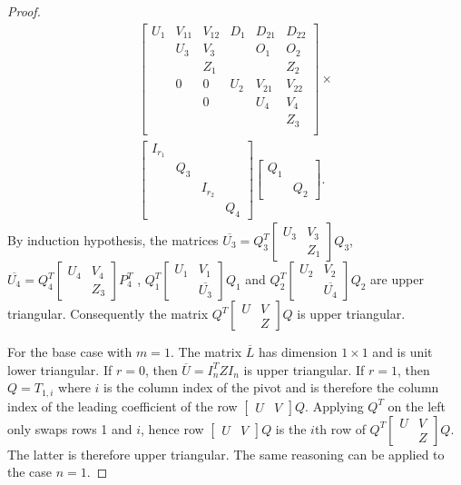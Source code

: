 \documentclass{article}
\begin{document}
\begin{proof}
\begin{equation*}
\begin{split}
    \left[
        \begin{array}{ccc|cccc}
          U_1  & V_{11} & V_{12} &D_1 &D_{21}&D_{22}\\
                &U_3   & V_3    &    &O_1 & O_2\\
                &      & Z_1    &    &   & Z_2\\
                &0     & 0     &U_2 &V_{21}&V_{22}\\
                &      & 0     &    & U_4& V_4\\
                &      &        &    &   &Z_3\\
        \end{array}
      \right]\times \\
      \begin{bmatrix} I_{r_1}\\&Q_3\\&& I_{r_2}\\&&&Q_4 \end{bmatrix}
   \begin{bmatrix}Q_1\\&Q_2 \end{bmatrix}.
\end{split}
\end{equation*}
By induction hypothesis, the matrices
$\overline{U_3}=Q_3^T \begin{bmatrix}U_3&V_3\\&Z_1\end{bmatrix}Q_3$,
$\overline{U_4}=Q_4^T \begin{bmatrix}U_4&V_4\\&Z_3\end{bmatrix}P_4^T$
, $Q_1^T \begin{bmatrix}  U_1&V_1\\     &\overline{U_3} \end{bmatrix} Q_1$
and
$Q_2^T\begin{bmatrix}  U_2&V_2\\  &\overline{U_4}\end{bmatrix}Q_2$ are upper triangular.
Consequently the matrix  $Q^T\left[\begin{smallmatrix}  U&V\\  &Z
\end{smallmatrix}\right]Q$ is upper triangular.

For the base case with $m=1$. The matrix $\overline{L}$ has dimension $1\times
1$ and is unit lower triangular. If $r=0$, then $\overline{U}=I_n^T Z I_n$ is
upper triangular. If $r=1$, then $Q=T_{1,i}$ where $i$ is the column index of
the pivot and is therefore the column index of the  leading coefficient of the row
$\begin{bmatrix}U&V\end{bmatrix}Q$. Applying $Q^T$ on the left only swaps rows 1
  and $i$, hence row $\begin{bmatrix}U&V\end{bmatrix}Q$ is the $i$th row of
    $Q^T\begin{bmatrix}  U&V\\&Z\end{bmatrix}Q$. The latter is
therefore upper triangular. The same reasoning can be applied to the case $n=1$.
\end{proof}
\end{document}
